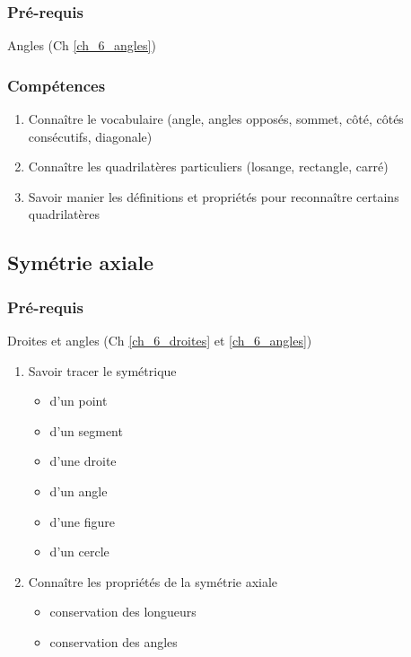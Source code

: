 \subsubsection*{Pré-requis}
Angles (Ch \ref{ch_6_angles})

\subsubsection*{Compétences}

\begin{enumerate}
	\item Connaître le vocabulaire (angle, angles opposés, sommet, côté, côtés consécutifs, diagonale)
	\item Connaître les quadrilatères particuliers (losange, rectangle, carré)
	\item Savoir manier les définitions et propriétés pour reconnaître certains quadrilatères
\end{enumerate}

\subsection{Symétrie axiale}\label{ch_6_sym}

\subsubsection*{Pré-requis}
 Droites et angles (Ch \ref{ch_6_droites} et \ref{ch_6_angles})
\begin{enumerate}
	\item Savoir tracer le symétrique 
		\begin{itemize}
			\item d'un point
			\item d'un segment
			\item d'une droite
			\item d'un angle
			\item d'une figure
			\item d'un cercle
		\end{itemize}
	\item Connaître les propriétés de la symétrie axiale
	\begin{itemize}
		\item conservation des longueurs
		\item conservation des angles
	\end{itemize}
\end{enumerate}

